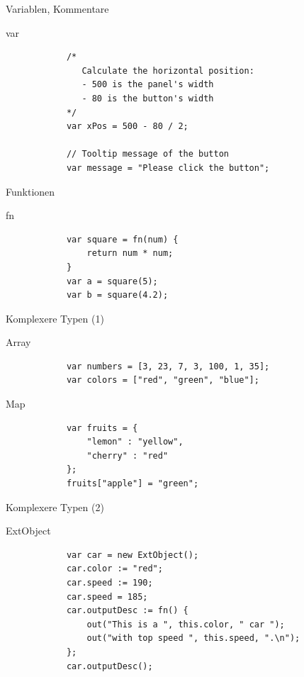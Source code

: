 \documentclass[ucs,9pt]{beamer}
\begin{document}
\begin{frame}[fragile]{Variablen, Kommentare}
	\begin{block}{var}
		\begin{lstlisting}
			/*
			   Calculate the horizontal position:
			   - 500 is the panel's width
			   - 80 is the button's width
			*/
			var xPos = 500 - 80 / 2;

			// Tooltip message of the button
			var message = "Please click the button";
		\end{lstlisting}
	\end{block}
\end{frame}

\begin{frame}[fragile]{Funktionen}
	\begin{block}{fn}
		\begin{lstlisting}
			var square = fn(num) {
			    return num * num;
			}
			var a = square(5);
			var b = square(4.2);
		\end{lstlisting}
	\end{block}
\end{frame}

\begin{frame}[fragile]{Komplexere Typen (1)}
	\begin{block}{Array}
		\begin{lstlisting}
			var numbers = [3, 23, 7, 3, 100, 1, 35];
			var colors = ["red", "green", "blue"];
		\end{lstlisting}
	\end{block}
	\begin{block}{Map}
		\begin{lstlisting}
			var fruits = {
			    "lemon" : "yellow",
			    "cherry" : "red"
			};
			fruits["apple"] = "green";
		\end{lstlisting}
	\end{block}
\end{frame}

\begin{frame}[fragile]{Komplexere Typen (2)}
	\begin{block}{ExtObject}
		\begin{lstlisting}
			var car = new ExtObject();
			car.color := "red";
			car.speed := 190;
			car.speed = 185;
			car.outputDesc := fn() {
			    out("This is a ", this.color, " car ");
			    out("with top speed ", this.speed, ".\n");
			};
			car.outputDesc();
		\end{lstlisting}
	\end{block}
\end{frame}
\end{document}

